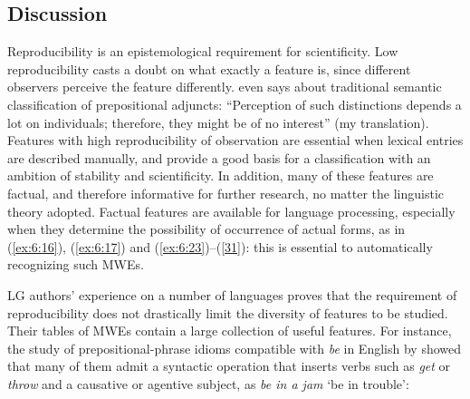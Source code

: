 \documentclass[output=paper]{langsci/langscibook}
\begin{document}
\subsection{Discussion}  

Reproducibility is an epistemological requirement for scientificity. Low reproducibility casts a doubt on what exactly a feature is, since different observers perceive the feature differently. \citet[14]{Gross1981} even says about traditional semantic classification of prepositional adjuncts: “Perception of such distinctions depends a lot on individuals; therefore, they might be of no interest” (my translation). Features with high reproducibility of observation are essential when lexical entries are described manually, and provide a good basis for a classification with an ambition of stability and scientificity. In addition, many of these features are factual, and therefore informative for further research, no matter the linguistic theory adopted. Factual features are available for  language processing, especially when they determine the possibility of occurrence of actual forms, as in (\ref{ex:6:16}), (\ref{ex:6:17}) and (\ref{ex:6:23})–(\ref{31}): this is essential to automatically recognizing such MWEs.

LG authors’ experience on a number of languages proves that the requirement of reproducibility does not drastically limit the diversity of features to be studied. Their tables of MWEs contain a large collection of useful features. For instance, the study of prepositional-phrase idioms compatible with \textit{be} in English by \citet{Machonis1987} showed that many of them admit a syntactic operation that inserts verbs such as \textit{get} or \textit{throw} and a causative or agentive subject, as \textit{be in a jam} ‘be in trouble’:


\begin{exe}
\ex \label{37} 
\begin{xlist}
\end{xlist}
\end{exe}
\end{document}
